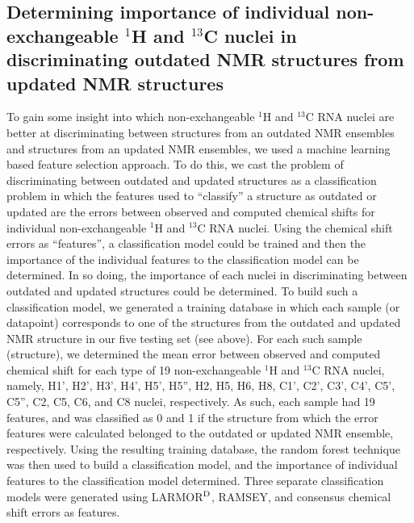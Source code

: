 \documentclass[fleqn,10pt]{wlscirep}
\begin{document}
\subsection*{Determining importance of individual non-exchangeable $^{1}$H and $^{13}$C nuclei in discriminating outdated NMR structures from updated NMR structures} To gain some insight into which non-exchangeable $^{1}$H and $^{13}$C RNA nuclei are better at  discriminating between structures from an outdated NMR ensembles and structures from an updated NMR ensembles, we used a machine learning based feature selection approach. To do this, we cast the problem of discriminating between outdated and updated structures as a classification problem in which the features used to ``classify'' a structure as outdated or updated are the errors between observed and computed chemical shifts for individual non-exchangeable $^{1}$H and $^{13}$C RNA nuclei. Using the chemical shift errors as ``features'', a classification model could be trained and then the importance of the individual features to the classification model can be determined. In so doing, the importance of each nuclei in discriminating between outdated and updated structures could be determined. To build such a classification model, we generated a training database in which each sample (or datapoint) corresponds to one of the structures from the outdated and updated NMR structure in our five testing set (see above). For each such sample (structure), we determined the mean error between observed and computed chemical shift for each type of 19 non-exchangeable $^{1}$H and $^{13}$C RNA nuclei, namely,  H1', H2', H3', H4', H5', H5'', H2, H5, H6, H8, C1', C2', C3', C4', C5', C5'', C2, C5, C6,  and C8 nuclei, respectively. As such, each sample had 19 features, and was classified as 0 and 1 if the structure from which the error features were calculated belonged to the outdated or updated NMR ensemble, respectively.  Using the resulting training database, the random forest technique was then used to build a classification model, and the importance of individual features to the classification model determined. Three separate classification models were generated using LARMOR$^{\rm D}$, RAMSEY, and consensus chemical shift errors as features.
\end{document}
